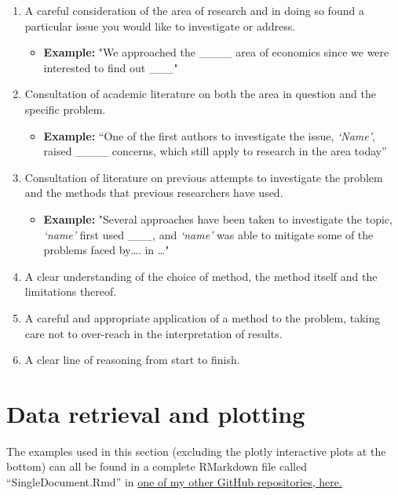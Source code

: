 \documentclass[
]{book}
\providecommand{\tightlist}{%
  \setlength{\itemsep}{0pt}\setlength{\parskip}{0pt}}
\begin{document}
\begin{enumerate}
\def\labelenumi{\arabic{enumi}.}
\item
  A careful consideration of the area of research and in doing so found a particular issue you would like to investigate or address.

  \begin{itemize}
  \tightlist
  \item
    \textbf{Example:} "We approached the \_\_\_\_ area of economics since we were interested to find out \_\_\_"
  \end{itemize}
\item
  Consultation of academic literature on both the area in question and the specific problem.

  \begin{itemize}
  \tightlist
  \item
    \textbf{Example:} ``One of the first authors to investigate the issue, \emph{`Name'}, raised \_\_\_\_ concerns, which still apply to research in the area today''
  \end{itemize}
\item
  Consultation of literature on previous attempts to investigate the problem and the methods that previous researchers have used.

  \begin{itemize}
  \tightlist
  \item
    \textbf{Example:} "Several approaches have been taken to investigate the topic, \emph{`name'} first used \_\_\_, and \emph{`name'} was able to mitigate some of the problems faced by\ldots. in \ldots"
  \end{itemize}
\item
  A clear understanding of the choice of method, the method itself and the limitations thereof.
\item
  A careful and appropriate application of a method to the problem, taking care not to over-reach in the interpretation of results.
\item
  A clear line of reasoning from start to finish.
\end{enumerate}

\hypertarget{data-retrieval-and-plotting}{%
\chapter{Data retrieval and plotting}\label{data-retrieval-and-plotting}}

The examples used in this section (excluding the plotly interactive plots at the bottom) can all be found in a complete RMarkdown file called ``SingleDocument.Rmd'' in \href{https://github.com/robabsmith/Rmarkdown-project-template}{one of my other GitHub repositories, here.}
\end{document}
